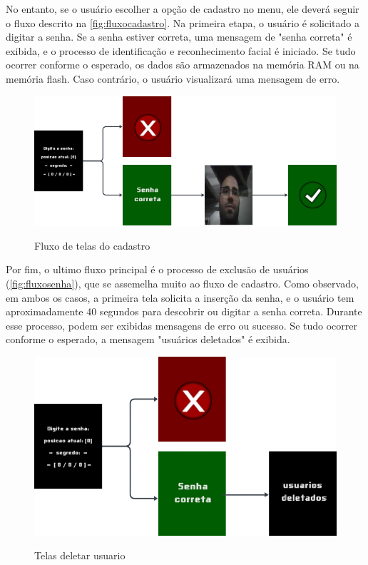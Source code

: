 No entanto, se o usuário escolher a opção de cadastro no menu, 
ele deverá seguir o fluxo descrito na \autoref{fig:fluxocadastro}. 
Na primeira etapa, o usuário é solicitado a digitar a senha. 
Se a senha estiver correta, uma mensagem de "senha correta" é 
exibida, e o processo de identificação e reconhecimento facial 
é iniciado. Se tudo ocorrer conforme o esperado, os dados são 
armazenados na memória RAM ou na memória flash. Caso contrário, 
o usuário visualizará uma mensagem de erro.

\begin{figure}[h!]
    \centering
    \caption{Fluxo de telas do cadastro}
    \includegraphics[scale=2]{figuras/fluxo_cadastro.png}
    \fonte{}%
    \label{fig:fluxocadastro}
    \centering
\end{figure}


Por fim, o ultimo fluxo principal é o processo de exclusão 
de usuários (\autoref{fig:fluxosenha}), que se assemelha 
muito ao fluxo de cadastro. Como observado, em ambos 
os casos, a primeira tela solicita a inserção 
da senha, e o usuário tem aproximadamente 40 segundos 
para descobrir ou digitar a senha correta. Durante esse processo, 
podem ser exibidas mensagens de erro ou sucesso. Se tudo ocorrer 
conforme o esperado, a mensagem "usuários deletados" é exibida.

\begin{figure}[h!]
    \centering
    \caption{Telas deletar usuario}
    \includegraphics[scale=1.8]{figuras/fluxo_deletar_usuario.png}
    \fonte{}%
    \label{fig:fluxosenha}
    \centering
\end{figure}

